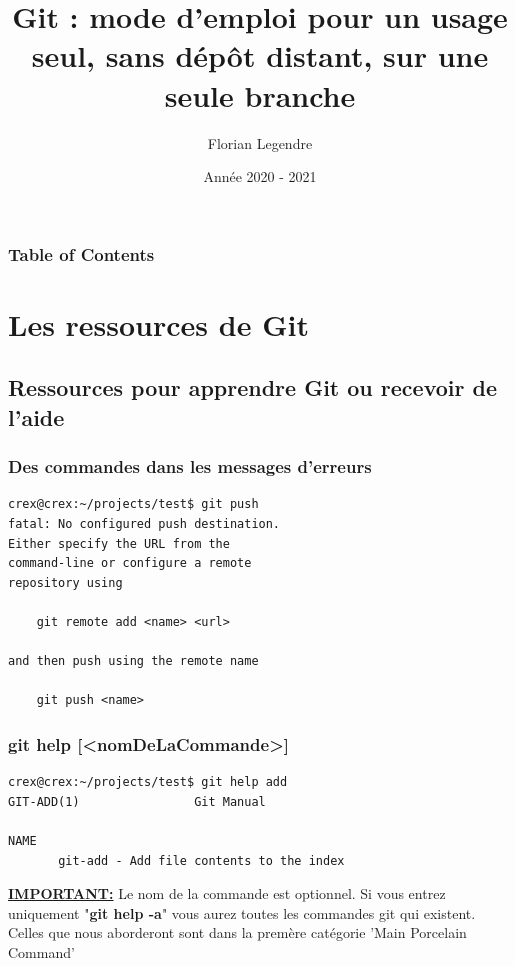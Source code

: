 \documentclass{beamer}
\title[Git seul en local mono-branche]{Git : mode d'emploi pour un usage seul, sans dépôt distant, sur une seule branche}
\author{Florian Legendre}
\institute{Université de Poitiers}
\date{Année 2020 - 2021}
\begin{document}
\frame{\titlepage}

\begin{frame}
\frametitle{Table of Contents}
\tableofcontents[hideallsubsections]
\end{frame}


\section{Les ressources de Git}

\subsection{Ressources pour apprendre Git ou recevoir de l'aide}
\begin{frame}[fragile]
    \frametitle{Des commandes dans les messages d'erreurs}
    \begin{mdframed}[style=Bash]
    \begin{lstlisting}[style=Bash, caption={Exemple de message d'erreur}]
crex@crex:~/projects/test$ git push
fatal: No configured push destination.
Either specify the URL from the 
command-line or configure a remote 
repository using

    git remote add <name> <url>
    
and then push using the remote name

    git push <name>
    \end{lstlisting}
    \end{mdframed}
\end{frame}

\begin{frame}[fragile]
\frametitle{git help [<nomDeLaCommande>]}
\begin{mdframed}[style=Bash]
    \begin{lstlisting}[style=Bash, caption={Extrait d'un appel de git help sur la commande "add"}]
crex@crex:~/projects/test$ git help add
GIT-ADD(1)                Git Manual                                                                     

NAME
       git-add - Add file contents to the index
    \end{lstlisting}
\end{mdframed}

\textbf{\underline{IMPORTANT:}} Le nom de la commande est optionnel. Si vous entrez uniquement "\textbf{git help -a}" vous aurez toutes les commandes git qui existent. Celles que nous aborderont sont dans la premère catégorie 'Main Porcelain Command'
\end{frame}
\end{document}
